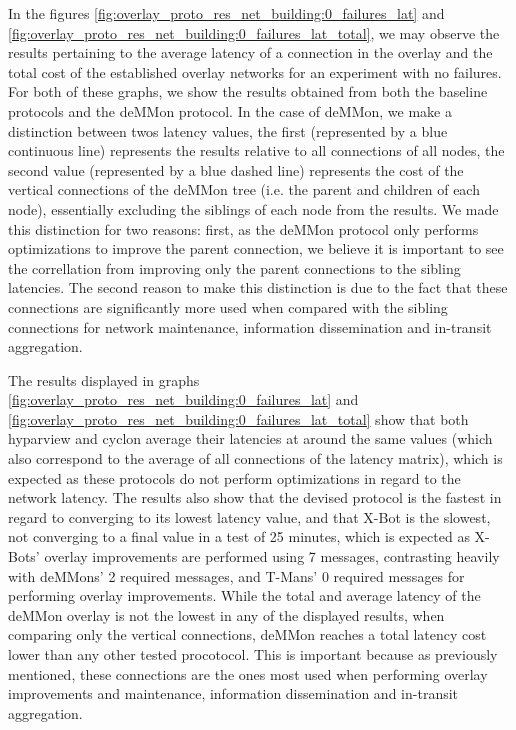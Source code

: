 In the figures \ref{fig:overlay_proto_res_net_building:0_failures_lat} and \ref{fig:overlay_proto_res_net_building:0_failures_lat_total}, we may observe the results pertaining to the average latency of a connection in the overlay and the total cost of the established overlay networks for an experiment with no failures. For both of these graphs, we show the results obtained from both the baseline protocols and the deMMon protocol. In the case of deMMon, we make a distinction between twos latency values, the first (represented by a blue continuous line) represents the results relative to all connections of all nodes, the second value (represented by a blue dashed line) represents the cost of the vertical connections of the deMMon tree (i.e. the parent and children of each node), essentially excluding the siblings of each node from the results. We made this distinction for two reasons: first, as the deMMon protocol only performs optimizations to improve the parent connection, we believe it is important to see the correllation from improving only the parent connections to the sibling latencies. The second reason to make this distinction is due to the fact that these connections are significantly more used when compared with the sibling connections for network maintenance, information dissemination and in-transit aggregation.

The results displayed in graphs \ref{fig:overlay_proto_res_net_building:0_failures_lat} and \ref{fig:overlay_proto_res_net_building:0_failures_lat_total} show that both hyparview and cyclon average their latencies at around the same values (which also correspond to the average of all connections of the latency matrix), which is expected as these protocols do not perform optimizations in regard to the network latency. The results also show that the devised protocol is the fastest in regard to converging to its lowest latency value, and that X-Bot is the slowest, not converging to a final value in a test of 25 minutes, which is expected as X-Bots' overlay improvements are performed using 7 messages, contrasting heavily with deMMons' 2 required messages, and T-Mans' 0 required messages for performing overlay improvements. While the total and average latency of the deMMon overlay is not the lowest in any of the displayed results, when comparing only the vertical connections, deMMon reaches a total latency cost lower than any other tested procotocol. This is important because as previously mentioned, these connections are the ones most used when performing overlay improvements and maintenance, information dissemination and in-transit aggregation. 

